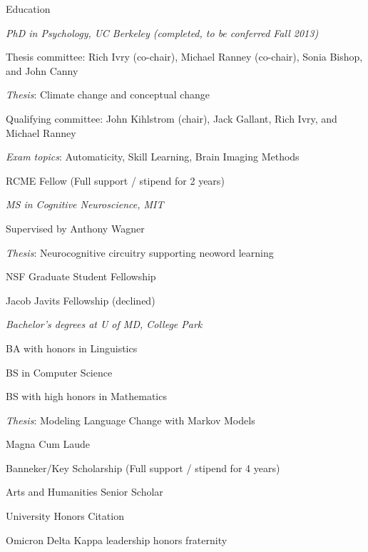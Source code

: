 \begin{rubric}{Education}

\entry*[2007--present] \emph{PhD in Psychology, UC Berkeley (completed, to be conferred
    Fall 2013)}
\par Thesis committee: Rich Ivry (co-chair), Michael Ranney (co-chair), Sonia
Bishop, and John Canny
\par \emph{Thesis}: Climate change and conceptual change
\par Qualifying committee: John Kihlstrom (chair), Jack Gallant, Rich Ivry, and
Michael Ranney
\par \emph{Exam topics}: Automaticity, Skill Learning, Brain Imaging Methods
\par RCME Fellow (Full support / stipend for 2 years)


\entry*[1999--2002] \emph{MS in Cognitive Neuroscience, MIT}
\par Supervised by Anthony Wagner
\par \emph{Thesis}: Neurocognitive circuitry supporting neoword learning
\par NSF Graduate Student Fellowship
\par Jacob Javits Fellowship (declined)




\entry*[1995--1999] \emph{Bachelor's degrees at U of MD, College Park}
\par BA with honors in Linguistics
\par BS in Computer Science
\par BS with high honors in Mathematics
\par \emph{Thesis}: Modeling Language Change with Markov Models
\par Magna Cum Laude
\par Banneker/Key Scholarship (Full support / stipend for 4 years)
\par Arts and Humanities Senior Scholar
\par University Honors Citation
\par Omicron Delta Kappa leadership honors fraternity

 

\end{rubric}
